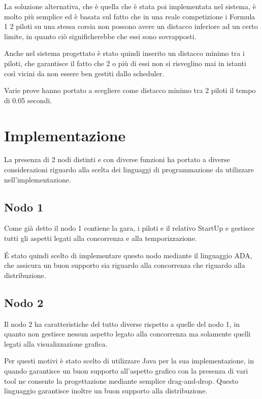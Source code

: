 \documentclass[a4paper,11pt, twoside]{book}
\begin{document}
      La soluzione alternativa, che è quella che è stata poi implementata nel sistema, è molto più semplice
      ed è basata sul fatto che in una reale competizione i Formula 1 2 piloti su una stessa corsia
      non possono avere un distacco inferiore ad un certo limite, in quanto ciò significherebbe che essi sono sovrapposti.
      
      Anche nel sistema progettato è stato quindi inserito un distacco minimo tra i piloti, che garantisce 
      il fatto che 2 o più di essi non si risveglino mai in istanti così vicini da non essere ben gestiti 
      dallo scheduler.
      
      Varie prove hanno portato a scegliere come distacco minimo tra 2 piloti il tempo di 0.05 secondi.
	  
  \chapter{Implementazione}
    La presenza di 2 nodi distinti e con diverse funzioni ha portato a diverse considerazioni riguardo alla
    scelta dei linguaggi di programmazione da utilizzare nell'implementazione.
    
    \section {Nodo 1}
      Come già detto il nodo 1 contiene la gara, i piloti e il relativo StartUp e gestisce tutti gli aspetti
      legati alla concorrenza e alla temporizzazione.
      
      É stato quindi scelto di implementare questo nodo mediante il linguaggio ADA, che assicura un buon supporto sia
      riguardo alla concorrenza che riguardo alla distribuzione.
      
    \section{Nodo 2}
      Il nodo 2 ha caratteristiche del tutto diverse rispetto a quelle del nodo 1, in quanto non gestisce nessun aspetto
      legato alla concorrenza ma solamente quelli legati alla visualizzazione grafica.
      
      Per questi motivi è stato scelto di utilizzare Java per la sua implementazione, in quando garantisce un buon supporto
      all'aspetto grafico con la presenza di vari tool ne consente la progettazione mediante semplice drag-and-drop.
      Questo linguaggio garantisce inoltre un buon supporto alla distribuzione.
      
\end{document}
